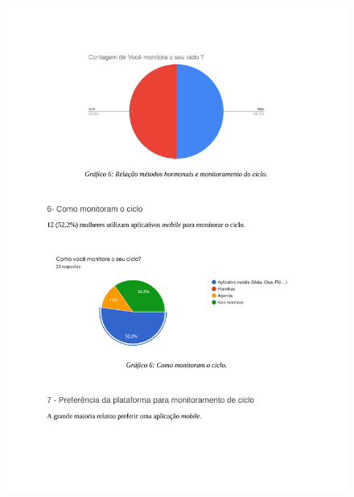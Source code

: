 \begin{apendicesenv}
    \begin{figure}[h]
        \centering
        \includegraphics[keepaspectratio=true,scale=0.7]{figuras/Tab5.pdf}
    \end{figure}
    

\end{apendicesenv}
